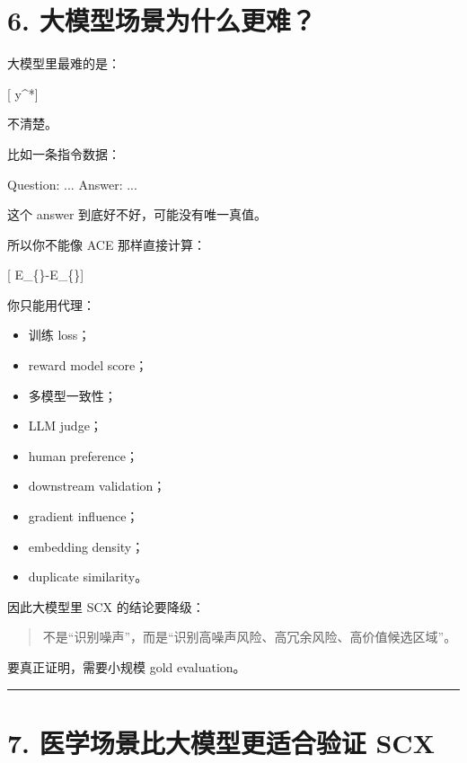 \documentclass[
  12pt,
]{ctexart}
\newenvironment{Shaded}{}{}
\newcommand{\NormalTok}[1]{#1}
\providecommand{\tightlist}{%
  \setlength{\itemsep}{0pt}\setlength{\parskip}{0pt}}
\begin{document}
\section{6.
大模型场景为什么更难？}\label{ux5927ux6a21ux578bux573aux666fux4e3aux4ec0ux4e48ux66f4ux96be}

大模型里最难的是：

{[} y\^{}*{]}

不清楚。

比如一条指令数据：

\begin{Shaded}
\begin{Highlighting}[]
\NormalTok{Question: ...}
\NormalTok{Answer: ...}
\end{Highlighting}
\end{Shaded}

这个 answer 到底好不好，可能没有唯一真值。

所以你不能像 ACE 那样直接计算：

{[} E\_\{\}-E\_\{\}{]}

你只能用代理：

\begin{itemize}
\tightlist
\item
  训练 loss；
\item
  reward model score；
\item
  多模型一致性；
\item
  LLM judge；
\item
  human preference；
\item
  downstream validation；
\item
  gradient influence；
\item
  embedding density；
\item
  duplicate similarity。
\end{itemize}

因此大模型里 SCX 的结论要降级：

\begin{quote}
不是``识别噪声''，而是``识别高噪声风险、高冗余风险、高价值候选区域''。
\end{quote}

要真正证明，需要小规模 gold evaluation。

\begin{center}\rule{0.5\linewidth}{0.5pt}\end{center}

\section{7. 医学场景比大模型更适合验证
SCX}\label{ux533bux5b66ux573aux666fux6bd4ux5927ux6a21ux578bux66f4ux9002ux5408ux9a8cux8bc1-scx}
\end{document}
